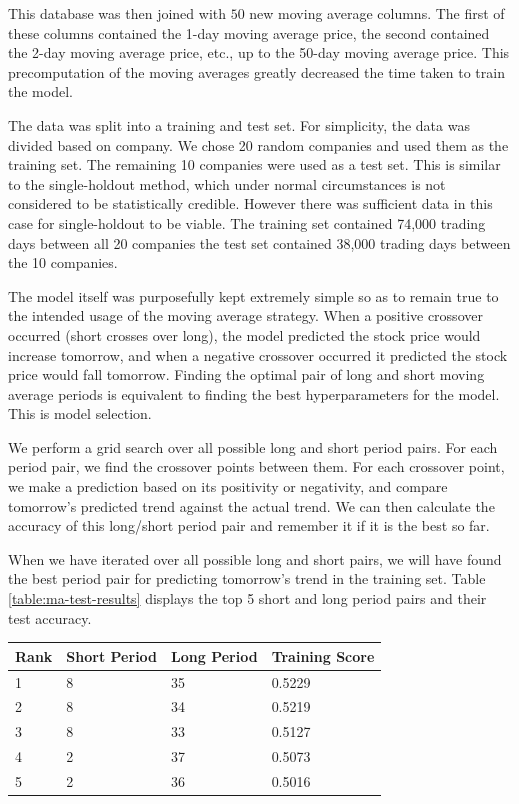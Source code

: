 \documentclass{report}
\begin{document}
This database was then joined with $50$ new moving average columns. The first of these columns contained the 1-day moving average price, the second contained the 2-day moving average price, etc., up to the 50-day moving average price. This precomputation of the moving averages greatly decreased the time taken to train the model.

The data was split into a training and test set. For simplicity, the data was divided based on company. We chose 20 random companies and used them as the training set. The remaining 10 companies were used as a test set. This is similar to the single-holdout method, which under normal circumstances is not considered to be statistically credible. However there was sufficient data in this case for single-holdout to be viable. The training set contained 74,000 trading days between all 20 companies the test set contained 38,000 trading days between the 10 companies.

The model itself was purposefully kept extremely simple so as to remain true to the intended usage of the moving average strategy. When a positive crossover occurred (short crosses over long), the model predicted the stock price would increase tomorrow, and when a negative crossover occurred it predicted the stock price would fall tomorrow. Finding the optimal pair of long and short moving average periods is equivalent to finding the best hyperparameters for the model. This is model selection.

We perform a grid search over all possible long and short period pairs. For each period pair, we find the crossover points between them. For each crossover point, we make a prediction based on its positivity or negativity, and compare tomorrow's predicted trend against the actual trend. We can then calculate the accuracy of this long/short period pair and remember it if it is the best so far.

When we have iterated over all possible long and short pairs, we will have found the best period pair for predicting tomorrow's trend in the training set. Table \ref{table:ma-test-results} displays the top 5 short and long period pairs and their test accuracy.


\begin{center}
    \begin{tabular}{l | l | l | l}
    Rank & Short Period & Long Period & Training Score \\ \hline
    1 & 8 & 35 & 0.5229 \\ \hline
    2 & 8 & 34 & 0.5219 \\ \hline
    3 & 8 & 33 & 0.5127 \\ \hline
    4 & 2 & 37 & 0.5073 \\ \hline
    5 & 2 & 36 & 0.5016 
    \label{table:ma-test-results}
    \end{tabular}
\end{center}
\end{document}
